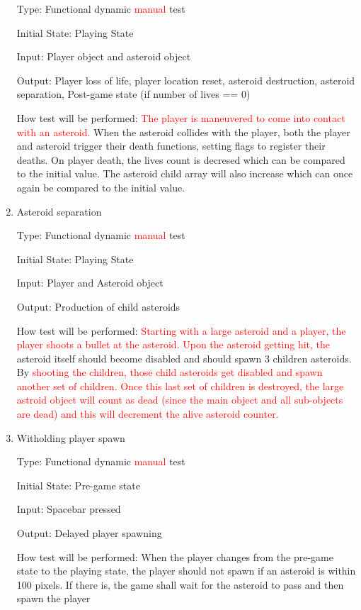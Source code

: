 \documentclass[12pt, titlepage]{article}
\begin{document}
\begin{enumerate}
Type: Functional dynamic \textcolor{red}{manual} test

Initial State: Playing State

Input: Player object and asteroid object

Output: Player loss of life, player location reset, asteroid destruction, asteroid separation, Post-game state (if number of lives == 0)

How test will be performed: \textcolor{red}{The player is maneuvered to come into contact with an asteroid.} When the asteroid collides with the player, both the player and asteroid trigger their death functions, setting flags to register their deaths. On player death, the lives count is decresed which can be compared to the initial value. The asteroid child array will also increase which can once again be compared to the initial value.

\item{Asteroid separation\\}

Type: Functional dynamic \textcolor{red}{manual} test

Initial State: Playing State

Input: Player and Asteroid object

Output: Production of child asteroids

How test will be performed: \textcolor{red}{Starting with a large asteroid and a player, the player shoots a bullet at the asteroid. Upon the asteroid getting hit, the} asteroid itself should become disabled and should spawn 3 children asteroids. By \textcolor{red}{shooting the children, those child asteroids get disabled and spawn another set of children. Once this last set of children is destroyed, the large astroid object will count as dead (since the main object and all sub-objects are dead) and this will decrement the alive asteroid counter.}

\item{Witholding player spawn\\}

Type: Functional dynamic \textcolor{red}{manual} test

Initial State: Pre-game state

Input: Spacebar pressed

Output: Delayed player spawning

How test will be performed: When the player changes from the pre-game state to the playing state, the player should not spawn if an asteroid is within 100 pixels. If there is, the game shall wait for the asteroid to pass and then spawn the player

\end{enumerate}
\end{document}
